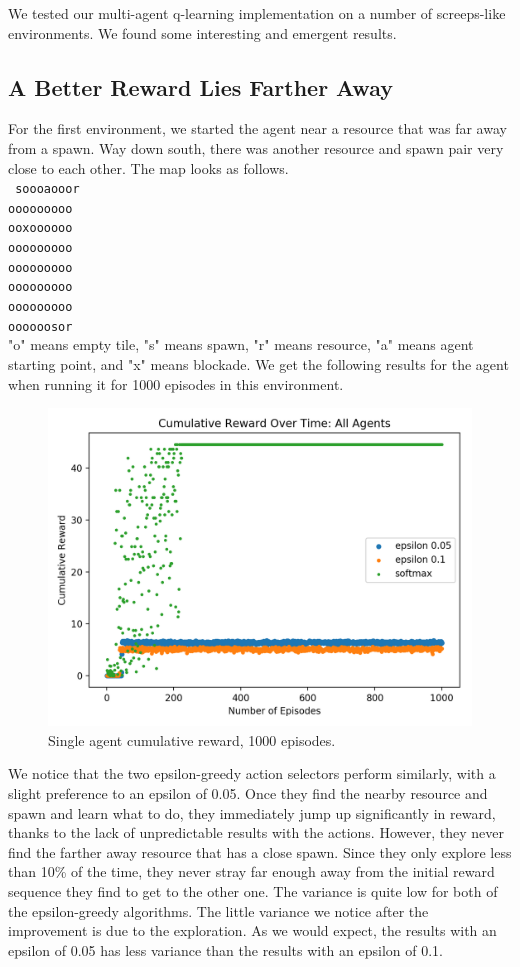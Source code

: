 \documentclass[11pt]{article}
\begin{document}
We tested our multi-agent q-learning implementation on a number of screeps-like environments. We found some interesting and emergent results.

\subsection{A Better Reward Lies Farther Away}

For the first environment, we started the agent near a resource that was far away from a spawn. Way down south, there was another resource and spawn pair very close to each other. The map looks as follows.\\
\texttt{
soooaooor\\
ooooooooo\\
ooxoooooo\\
ooooooooo\\
ooooooooo\\
ooooooooo\\
ooooooooo\\
oooooosor\\
}
"o" means empty tile, "s" means spawn, "r" means resource, "a" means agent starting point, and "x" means blockade. We get the following results for the agent when running it for 1000 episodes in this environment.\\

\begin{figure}[h]
  \centering
\includegraphics[width=.7\textwidth]{ai-env1.png}
\caption{Single agent cumulative reward, 1000 episodes.}
\end{figure}

We notice that the two epsilon-greedy action selectors perform similarly, with a slight preference to an epsilon of 0.05. Once they find the nearby resource and spawn and learn what to do, they immediately jump up significantly in reward, thanks to the lack of unpredictable results with the actions. However, they never find the farther away resource that has a close spawn. Since they only explore less than 10\% of the time, they never stray far enough away from the initial reward sequence they find to get to the other one. The variance is quite low for both of the epsilon-greedy algorithms. The little variance we notice after the improvement is due to the exploration. As we would expect, the results with an epsilon of 0.05 has less variance than the results with an epsilon of 0.1.
\end{document}
